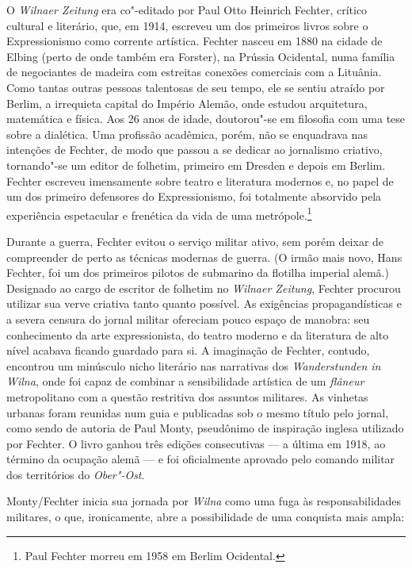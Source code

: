 O \textit{Wilnaer Zeitung} era co"-editado por Paul Otto Heinrich Fechter,
crítico cultural e literário, que, em 1914, escreveu um dos primeiros
livros sobre o Expressionismo como corrente artística. Fechter nasceu em
1880 na cidade de Elbing (perto de onde também era Forster), na Prússia
Ocidental, numa família de negociantes de madeira com estreitas conexões
comerciais com a Lituânia. Como tantas outras pessoas talentosas de seu
tempo, ele se sentiu atraído por Berlim, a irrequieta capital do Império
Alemão, onde estudou arquitetura, matemática e física. Aos 26 anos de
idade, doutorou"-se em filosofia com uma tese sobre a dialética. Uma
profissão acadêmica, porém, não se enquadrava nas intenções de Fechter,
de modo que passou a se dedicar ao jornalismo criativo, tornando"-se um
editor de folhetim, primeiro em Dresden e depois em Berlim. Fechter
escreveu imensamente sobre teatro e literatura modernos e, no papel de
um dos primeiro defensores do Expressionismo, foi totalmente absorvido
pela experiência espetacular e frenética da vida de uma
metrópole.\footnote{Paul Fechter morreu em 1958 em Berlim Ocidental.}

Durante a guerra, Fechter evitou o serviço militar ativo, sem porém
deixar de compreender de perto as técnicas modernas de guerra. (O irmão
mais novo, Hans Fechter, foi um dos primeiros pilotos de submarino da
flotilha imperial alemã.) Designado ao cargo de escritor de folhetim no
\textit{Wilnaer Zeitung}, Fechter procurou utilizar sua verve criativa
tanto quanto possível. As exigências propagandísticas e a severa censura
do jornal militar ofereciam pouco espaço de manobra: seu conhecimento da
arte expressionista, do teatro moderno e da literatura de alto nível
acabava ficando guardado para si. A imaginação de Fechter, contudo,
encontrou um minúsculo nicho literário nas narrativas dos
\textit{Wanderstunden in Wilna}, onde foi capaz de combinar a sensibilidade
artística de um \textit{flâneur} metropolitano com a questão restritiva
dos assuntos militares. As vinhetas urbanas foram reunidas num guia e
publicadas sob o mesmo título pelo jornal, como sendo de autoria de Paul
Monty, pseudônimo de inspiração inglesa utilizado por Fechter. O livro
ganhou três edições consecutivas --- a última em 1918, ao término da
ocupação alemã --- e foi oficialmente aprovado pelo comando militar dos
territórios do \textit{Ober"-Ost}.

Monty/Fechter inicia sua jornada por \textit{Wilna} como uma fuga às
responsabilidades militares, o que, ironicamente, abre a possibilidade
de uma conquista mais ampla:

